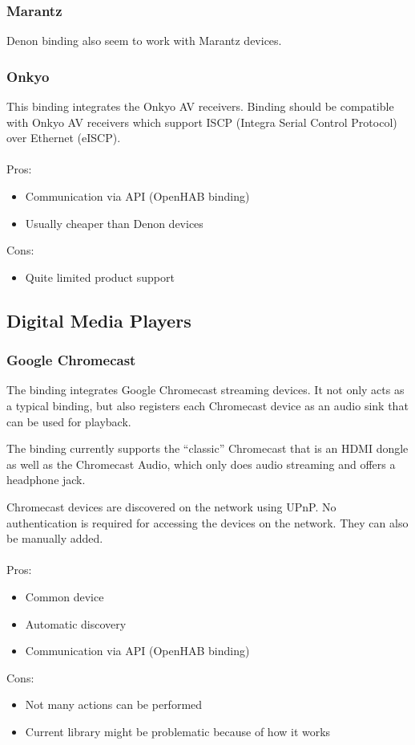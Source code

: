 \subsubsection{Marantz}
Denon binding also seem to work with Marantz devices.

\subsubsection{Onkyo}
This binding integrates the Onkyo AV receivers. Binding should be compatible with Onkyo 
AV receivers which support ISCP (Integra Serial Control Protocol) over Ethernet (eISCP).\\~\\
Pros:
\begin{itemize}
	\item Communication via API (OpenHAB binding)
	\item Usually cheaper than Denon devices
\end{itemize}
Cons:
\begin{itemize}
	\item Quite limited product support
\end{itemize}

\subsection{Digital Media Players}

\subsubsection{Google Chromecast}
The binding integrates Google Chromecast streaming devices.
It not only acts as a typical binding, but also registers each Chromecast device as an audio sink that can be used for playback.

The binding currently supports the “classic” Chromecast that is an HDMI dongle as well as the Chromecast Audio, which only does
 audio streaming and offers a headphone jack.

Chromecast devices are discovered on the network using UPnP. No authentication is required for accessing the devices on the network.
They can also be manually added.\\~\\
Pros:
\begin{itemize}
	\item Common device
	\item Automatic discovery
	\item Communication via API (OpenHAB binding)
\end{itemize}
Cons:
\begin{itemize}
	\item Not many actions can be performed
	\item Current library might be problematic because of how it works
\end{itemize}

